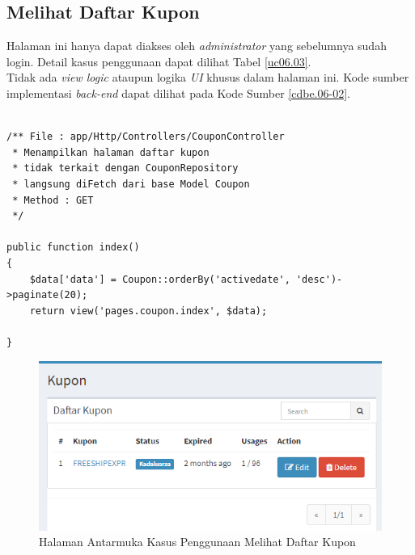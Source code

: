\subsection{Melihat Daftar Kupon}
Halaman ini hanya dapat diakses oleh \textit{administrator} yang sebelumnya sudah login. Detail kasus penggunaan dapat dilihat Tabel \ref{uc06.03}.\\
\indent Tidak ada \textit{view logic} ataupun logika \textit{UI} khusus dalam halaman ini. Kode sumber implementasi \textit{back-end} dapat dilihat pada Kode Sumber \ref{cdbe.06-02}.

\begin{lstlisting}[label=cdbe.06-02,style=php,caption=Kode Sumber Antarmuka Melihat Daftar Kupon]

/** File : app/Http/Controllers/CouponController
 * Menampilkan halaman daftar kupon
 * tidak terkait dengan CouponRepository
 * langsung diFetch dari base Model Coupon
 * Method : GET
 */

public function index()
{
    $data['data'] = Coupon::orderBy('activedate', 'desc')->paginate(20);
    return view('pages.coupon.index', $data);

}
\end{lstlisting}
      
  \begin{figure}[H]
    \centering
    \includegraphics[width=\textwidth]{images/bab4/ui/06-02.png}
    \caption{Halaman Antarmuka Kasus Penggunaan Melihat Daftar Kupon}
    \label{ui.06-02}
  \end{figure}
      
